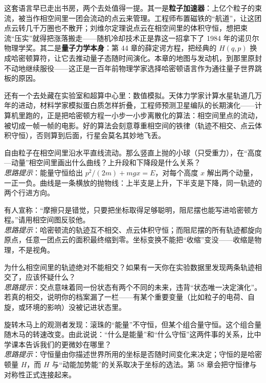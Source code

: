 这套语言早已走出书房，两个去处值得一提。其一是\textbf{粒子加速器}：上亿个粒子的束流，被当作相空间里一团会流动的点云来管理。工程师布置磁铁的“航道”，让这团点云转几千万圈也不散开；刘维尔定理说点云在相空间里的体积守恒，想把束流“压实”就得把涨落搬走——随机冷却技术正是靠这一招拿下了 1984 年的诺贝尔物理学奖。其二是\textbf{量子力学本身}：第 44 章的薛定谔方程，把经典的 \(H(q,p)\) 换成哈密顿算符，让它去推动量子态随时间演化。本章的地图与发动机，到那里原封不动地继续服役——这正是一百年前物理学家选择哈密顿语言作为通往量子世界跳板的原因。

还有一个去处藏在实验室和超算中心里：数值模拟。天体力学家计算水星轨道几万年的进动，材料学家模拟蛋白质怎样折叠，工程师预测卫星编队的长期演化——计算机里跑的，正是把哈密顿方程一小步一小步离散化的算法：相空间里点的流动，被切成一帧一帧的电影。好的算法会刻意尊重相空间的铁律（轨迹不相交、点云体积守恒），否则算到后面，行星会莫名其妙地飞丢。

\begin{puzzles}
\item 自由粒子在相空间里沿水平直线流动。那么竖直上抛的小球（只受重力），在“高度—动量”相空间里画出什么曲线？上升段和下降段是什么关系？\\
\emph{思路提示}：能量守恒给出 \(p^{2}/(2m)+mgx=E\)，对每个高度 \(x\) 解出两个动量，一正一负。曲线是一条横放的抛物线：上半支是上升，下半支是下降，同一轨迹的两个行进方向。
\item 有人宣称：“摩擦只是错觉，只要把坐标取得足够聪明，阻尼摆也能写进哈密顿方程。”请用相空间图反驳他。\\
\emph{思路提示}：哈密顿流的轨迹互不相交、点云体积守恒；而阻尼摆的所有轨迹都旋向原点，任意一团点云的面积最终缩到零。坐标变换不能把“收缩”变没——收缩是物理，不是视角。
\item 为什么相空间里的轨迹绝对不能相交？如果有一天你在实验数据里发现两条轨迹相交了，应该怀疑什么？\\
\emph{思路提示}：交点意味着同一份状态有两个不同的未来，违背“状态唯一决定演化”。若真的相交，说明你的档案漏了一栏——有某个重要变量（比如粒子的电荷、自旋，或环境的影响）没被记进状态里。
\item 旋转木马上的观测者发现：滚珠的“能量”不守恒，但某个组合量守恒。这个组合量随木马的转速改变。由此说说：“什么是能量”和“什么守恒”这两件事的关系，比中学课本告诉我们的更微妙在哪里？\\
\emph{思路提示}：守恒量由你描述世界所用的坐标是否随时间变化来决定；守恒的是哈密顿量 \(H\)，而 \(H\) 与“动能加势能”的关系取决于坐标的选法。第 58 章会把守恒律与对称性正式连接起来。
\end{puzzles}
